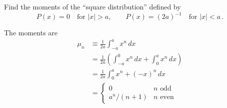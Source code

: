 

Find the moments of the ``square distribution'' defined by
\begin{equation*}
P(x) = 0 \quad \text{for }|x|>a, \qquad P(x)=(2a)^{-1} \quad \text{for }|x|<a \, .
\end{equation*}


The moments are
\begin{align*}
\mu_n
&\equiv \frac{1}{2a} \int_{-a}^a x^n \, dx \\
&= \frac{1}{2a} \left( \int_{-a}^0 x^n \, dx + \int_0^a x^n \, dx \right) \\
&= \frac{1}{2a}\int_0^a x^n + (-x)^n \, dx \\
&=
\left\{ \begin{array}{ll}
0 & n \text{ odd} \\
a^n/(n+1) & n \text{ even}
\end{array} \right.
\end{align*}